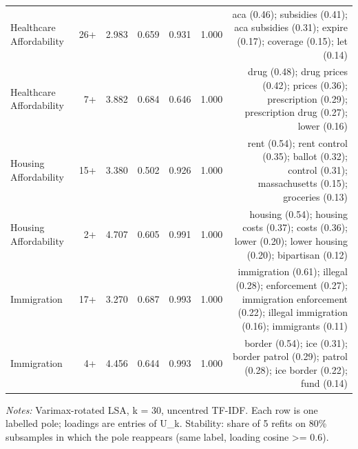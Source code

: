 \begin{table}[htbp]
\begin{tabular}{lrrrrrr}
Healthcare Affordability & 26+ & 2.983 & 0.659 & 0.931 & 1.000 & aca (0.46); subsidies (0.41); aca subsidies (0.31); expire (0.17); coverage (0.15); let (0.14) \\
Healthcare Affordability & 7+ & 3.882 & 0.684 & 0.646 & 1.000 & drug (0.48); drug prices (0.42); prices (0.36); prescription (0.29); prescription drug (0.27); lower (0.16) \\
Housing Affordability & 15+ & 3.380 & 0.502 & 0.926 & 1.000 & rent (0.54); rent control (0.35); ballot (0.32); control (0.31); massachusetts (0.15); groceries (0.13) \\
Housing Affordability & 2+ & 4.707 & 0.605 & 0.991 & 1.000 & housing (0.54); housing costs (0.37); costs (0.36); lower (0.20); lower housing (0.20); bipartisan (0.12) \\
Immigration & 17+ & 3.270 & 0.687 & 0.993 & 1.000 & immigration (0.61); illegal (0.28); enforcement (0.27); immigration enforcement (0.22); illegal immigration (0.16); immigrants (0.11) \\
Immigration & 4+ & 4.456 & 0.644 & 0.993 & 1.000 & border (0.54); ice (0.31); border patrol (0.29); patrol (0.28); ice border (0.22); fund (0.14) \\
\bottomrule
\end{tabular}
\par\smallskip\footnotesize\emph{Notes:} Varimax-rotated LSA, k = 30, uncentred TF-IDF. Each row is one labelled pole; loadings are entries of U\_k. Stability: share of 5 refits on 80\% subsamples in which the pole reappears (same label, loading cosine >= 0.6).
\end{table}